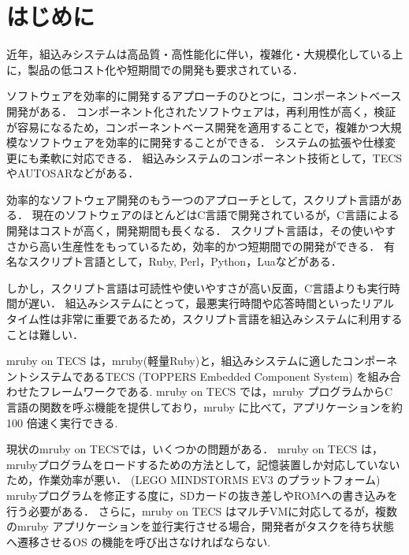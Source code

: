\documentclass[submit,techrep]{ipsj}
\begin{document}

\maketitle

\section{はじめに}
近年，組込みシステムは高品質・高性能化に伴い，複雑化・大規模化している上に，製品の低コスト化や短期間での開発も要求されている．

ソフトウェアを効率的に開発するアプローチのひとつに，コンポーネントベース開発がある．
コンポーネント化されたソフトウェアは，再利用性が高く，検証が容易になるため，コンポーネントベース開発を適用することで，複雑かつ大規模なソフトウェアを効率的に開発することができる．
システムの拡張や仕様変更にも柔軟に対応できる．
組込みシステムのコンポーネント技術として，TECS\cite{par:TECS}やAUTOSAR\cite{url:AUTOSAR}などがある．

効率的なソフトウェア開発のもう一つのアプローチとして，スクリプト言語がある．
現在のソフトウェアのほとんどはC言語で開発されているが，C言語による開発はコストが高く，開発期間も長くなる．
スクリプト言語は，その使いやすさから高い生産性をもっているため，効率的かつ短期間での開発ができる．
有名なスクリプト言語として，Ruby, Perl，Python，Luaなどがある．

しかし，スクリプト言語は可読性や使いやすさが高い反面，C言語よりも実行時間が遅い．
組込みシステムにとって，最悪実行時間や応答時間といったリアルタイム性は非常に重要であるため，スクリプト言語を組込みシステムに利用することは難しい．

mruby on TECS は，mruby(軽量Ruby)\cite{par:mruby}と，組込みシステムに適したコンポーネントシステムであるTECS (TOPPERS Embedded Component System) を組み合わせたフレームワークである\cite{par:mrubyonTECS}.
mruby on TECS では，mruby プログラムからC 言語の関数を呼ぶ機能を提供しており，mruby に比べて，アプリケーションを約100 倍速く実行できる.

現状のmruby on TECSでは，いくつかの問題がある．
mruby on TECS は，mrubyプログラムをロードするための方法として，記憶装置しか対応していないため，作業効率が悪い．
(LEGO MINDSTORMS EV3 のプラットフォーム\cite{par:EV3})
mrubyプログラムを修正する度に，SDカードの抜き差しやROMへの書き込みを行う必要がある．
さらに，mruby on TECS はマルチVMに対応してるが，複数のmruby アプリケーションを並行実行させる場合，開発者がタスクを待ち状態へ遷移させるOS の機能を呼び出さなければならない.
\end{document}
